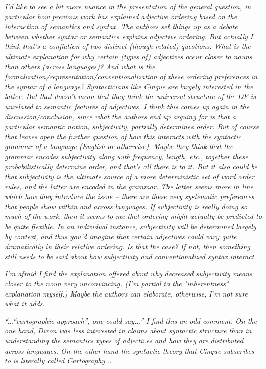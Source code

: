 \documentclass[12pt]{article}
\begin{document}
\item \emph{I'd like to see a bit more nuance in the presentation of the general question, in particular how previous work has explained adjective ordering based on the interaction of semantics and syntax. The authors set things up as a debate between whether syntax or semantics explains adjective ordering. But actually I think that's a conflation of two distinct (though related) questions: What is the ultimate explanation for why certain (types of) adjectives occur closer to nouns than others (across languages)? And what is the formalization/representation/conventionalization of these ordering preferences in the syntax of a language? Syntacticians like Cinque are largely interested in the latter. But that doesn't mean that they think the universal structure of the DP is unrelated to semantic features of adjectives.
I think this comes up again in the discussion/conclusion, since what the authors end up arguing for is that a particular semantic notion, subjectivity, partially determines order. But of course that leaves open the further question of how this interacts with the syntactic grammar of a language (English or otherwise). Maybe they think that the grammar encodes subjectivity along with frequency, length, etc., together these probabilistically determine order, and that's all there is to it. But it also could be that subjectivity is the ultimate source of a more deterministic set of word order rules, and the latter are encoded in the grammar. The latter seems more in line which how they introduce the issue -- there are these very systematic preferences that people show within and across languages. If subjectivity is really doing so much of the work, then it seems to me that ordering might actually be predicted to be quite flexible. In an individual instance, subjectivity will be
determined largely by context, and thus you'd imagine that certain adjectives could vary quite dramatically in their relative ordering. Is that the case? If not, then something still needs to be said about how subjectivity and conventionalized syntax interact.}

\item \emph{I'm afraid I find the explanation offered about why decreased subjectivity means closer to the noun very unconvincing. (I'm partial to the "inherentness" explanation myself.) Maybe the authors can elaborate, otherwise, I'm not sure what it adds.}

\item \emph{``...``cartographic approach'', one could say...'' I find this an odd comment. On the one hand, Dixon was less interested in claims about syntactic structure than in understanding the semantics types of adjectives and how they are distributed across languages. On the other hand the syntactic theory that Cinque subscribes to is literally called Cartography...}
\end{document}
